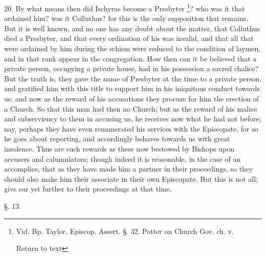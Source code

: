 20. By what means then did Ischyras become a
Presbyter \footnote{Vid. Bp. Taylor, Episcop. Assert. §. 32. Potter on Church Gov. ch. v.

Return to text}? who was it
that ordained him? was it Colluthus? for this is the only supposition
that remains. But it is well known, and no one has any doubt about the
matter, that Colluthus died a Presbyter, and that every ordination of
his was invalid, and that all that were ordained by him during the
schism were reduced to the condition of laymen, and in that rank
appear in the congregation. How then can it be believed that a private
person, occupying a private house, had in his possession a sacred
chalice? But the truth is, they gave the name of Presbyter at the time
to a private person, and gratified him with this title to support him
in his iniquitous conduct towards us; and now as the reward of his
accusations they procure for him the erection of a Church. So that
this man had then no Church; but as the reward of his malice and
subserviency to them in accusing us, he receives now what he had not
before; nay, perhaps they have even remunerated his services with the
Episcopate, for so he goes about reporting, and accordingly behaves
towards us with great insolence. Thus are such rewards as these now
bestowed by Bishops upon accusers and calumniators; though indeed it
is reasonable, in the case of an accomplice, that as they have
made him a partner in their proceedings, so they should also make him
their associate in their own Episcopate. But this is not all; give ear
yet further to their proceedings at that time.

§. 13.

